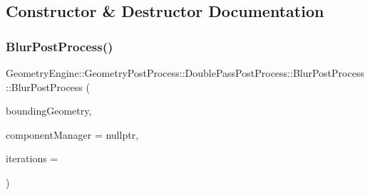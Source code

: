 \subsection{Constructor \& Destructor Documentation}
\mbox{\label{class_geometry_engine_1_1_geometry_post_process_1_1_double_pass_post_process_1_1_blur_post_process_ab7110b606555e9a5a4b7b1cbbd93b6d1}} 
\subsubsection{\texorpdfstring{BlurPostProcess()}{BlurPostProcess()}\hspace{0.1cm}{\footnotesize\ttfamily [1/2]}}
{\footnotesize\ttfamily Geometry\+Engine\+::\+Geometry\+Post\+Process\+::\+Double\+Pass\+Post\+Process\+::\+Blur\+Post\+Process\+::\+Blur\+Post\+Process (\begin{DoxyParamCaption}\item[{const \mbox{\hyperlink{class_geometry_engine_1_1_geometry_world_item_1_1_geometry_item_1_1_geometry_item}{Geometry\+World\+Item\+::\+Geometry\+Item\+::\+Geometry\+Item}} \&}]{bounding\+Geometry,  }\item[{const \mbox{\hyperlink{class_geometry_engine_1_1_custom_shading_1_1_custom_post_process_step_interface}{Custom\+Shading\+::\+Custom\+Post\+Process\+Step\+Interface}} $\ast$const}]{component\+Manager = {\ttfamily nullptr},  }\item[{unsigned int}]{iterations = {} }\end{DoxyParamCaption})}


